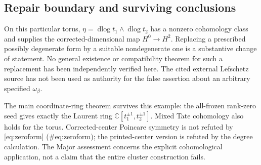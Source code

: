 \documentclass[10pt]{article}
\begin{document}
\subsection*{Repair boundary and surviving conclusions}
On this particular torus, \(\eta=\operatorname{dlog}t_1\wedge\operatorname{dlog}t_2\) has a nonzero cohomology class and supplies the corrected-dimensional map \(H^0\to H^2\). Replacing a prescribed possibly degenerate form by a suitable nondegenerate one is a substantive change of statement. No general existence or compatibility theorem for such a replacement has been independently verified here. The cited external Lefschetz source has not been used as authority for the false assertion about an arbitrary specified \(\omega_\beta\).\par
The main coordinate-ring theorem survives this example: the all-frozen rank-zero seed gives exactly the Laurent ring \(\mathbb C[t_1^{\pm1},t_2^{\pm1}]\). Mixed Tate cohomology also holds for the torus. Corrected-center Poincare symmetry is not refuted by [eq:zeroform] (\#eq:zeroform); the printed-center version is refuted by the degree calculation. The Major assessment concerns the explicit cohomological application, not a claim that the entire cluster construction fails.\par
\end{document}
